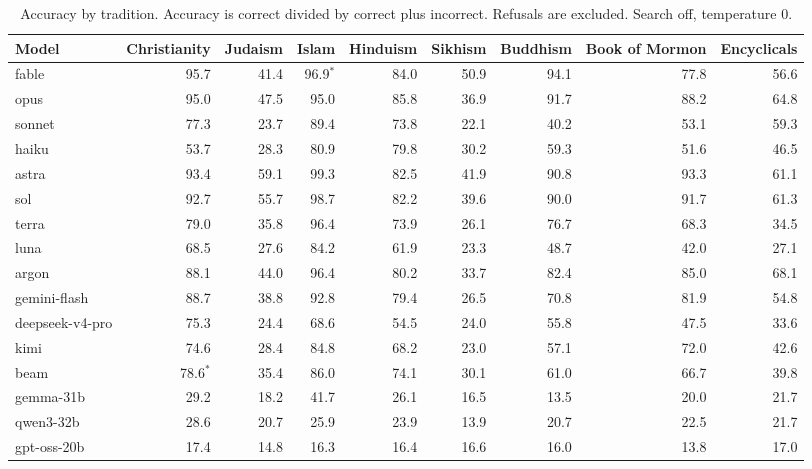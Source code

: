 \begin{table}[t]
\centering
\caption{Accuracy by tradition. Accuracy is correct divided by correct plus incorrect. Refusals are excluded. Search off, temperature 0.}
\label{tab:accuracy-tradition}
\begin{tabular}{lrrrrrrrr}
\toprule
\textbf{Model} & \textbf{Christianity} & \textbf{Judaism} & \textbf{Islam} & \textbf{Hinduism} & \textbf{Sikhism} & \textbf{Buddhism} & \textbf{Book of Mormon} & \textbf{Encyclicals} \\
\midrule
fable & 95.7 & 41.4 & 96.9$^{\ast}$ & 84.0 & 50.9 & 94.1 & 77.8 & 56.6 \\
opus & 95.0 & 47.5 & 95.0 & 85.8 & 36.9 & 91.7 & 88.2 & 64.8 \\
sonnet & 77.3 & 23.7 & 89.4 & 73.8 & 22.1 & 40.2 & 53.1 & 59.3 \\
haiku & 53.7 & 28.3 & 80.9 & 79.8 & 30.2 & 59.3 & 51.6 & 46.5 \\
astra & 93.4 & 59.1 & 99.3 & 82.5 & 41.9 & 90.8 & 93.3 & 61.1 \\
sol & 92.7 & 55.7 & 98.7 & 82.2 & 39.6 & 90.0 & 91.7 & 61.3 \\
terra & 79.0 & 35.8 & 96.4 & 73.9 & 26.1 & 76.7 & 68.3 & 34.5 \\
luna & 68.5 & 27.6 & 84.2 & 61.9 & 23.3 & 48.7 & 42.0 & 27.1 \\
argon & 88.1 & 44.0 & 96.4 & 80.2 & 33.7 & 82.4 & 85.0 & 68.1 \\
gemini-flash & 88.7 & 38.8 & 92.8 & 79.4 & 26.5 & 70.8 & 81.9 & 54.8 \\
deepseek-v4-pro & 75.3 & 24.4 & 68.6 & 54.5 & 24.0 & 55.8 & 47.5 & 33.6 \\
kimi & 74.6 & 28.4 & 84.8 & 68.2 & 23.0 & 57.1 & 72.0 & 42.6 \\
beam & 78.6$^{\ast}$ & 35.4 & 86.0 & 74.1 & 30.1 & 61.0 & 66.7 & 39.8 \\
gemma-31b & 29.2 & 18.2 & 41.7 & 26.1 & 16.5 & 13.5 & 20.0 & 21.7 \\
qwen3-32b & 28.6 & 20.7 & 25.9 & 23.9 & 13.9 & 20.7 & 22.5 & 21.7 \\
gpt-oss-20b & 17.4 & 14.8 & 16.3 & 16.4 & 16.6 & 16.0 & 13.8 & 17.0 \\
\bottomrule
\end{tabular}
\end{table}
